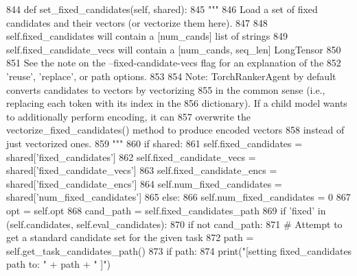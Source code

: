 \begin{DoxyCode}
844     \textcolor{keyword}{def }set\_fixed\_candidates(self, shared):
845         \textcolor{stringliteral}{"""}
846 \textcolor{stringliteral}{        Load a set of fixed candidates and their vectors (or vectorize them here).}
847 \textcolor{stringliteral}{}
848 \textcolor{stringliteral}{        self.fixed\_candidates will contain a [num\_cands] list of strings}
849 \textcolor{stringliteral}{        self.fixed\_candidate\_vecs will contain a [num\_cands, seq\_len] LongTensor}
850 \textcolor{stringliteral}{}
851 \textcolor{stringliteral}{        See the note on the --fixed-candidate-vecs flag for an explanation of the}
852 \textcolor{stringliteral}{        'reuse', 'replace', or path options.}
853 \textcolor{stringliteral}{}
854 \textcolor{stringliteral}{        Note: TorchRankerAgent by default converts candidates to vectors by vectorizing}
855 \textcolor{stringliteral}{        in the common sense (i.e., replacing each token with its index in the}
856 \textcolor{stringliteral}{        dictionary). If a child model wants to additionally perform encoding, it can}
857 \textcolor{stringliteral}{        overwrite the vectorize\_fixed\_candidates() method to produce encoded vectors}
858 \textcolor{stringliteral}{        instead of just vectorized ones.}
859 \textcolor{stringliteral}{        """}
860         \textcolor{keywordflow}{if} shared:
861             self.fixed\_candidates = shared[\textcolor{stringliteral}{'fixed\_candidates'}]
862             self.fixed\_candidate\_vecs = shared[\textcolor{stringliteral}{'fixed\_candidate\_vecs'}]
863             self.fixed\_candidate\_encs = shared[\textcolor{stringliteral}{'fixed\_candidate\_encs'}]
864             self.num\_fixed\_candidates = shared[\textcolor{stringliteral}{'num\_fixed\_candidates'}]
865         \textcolor{keywordflow}{else}:
866             self.num\_fixed\_candidates = 0
867             opt = self.opt
868             cand\_path = self.fixed\_candidates\_path
869             \textcolor{keywordflow}{if} \textcolor{stringliteral}{'fixed'} \textcolor{keywordflow}{in} (self.candidates, self.eval\_candidates):
870                 \textcolor{keywordflow}{if} \textcolor{keywordflow}{not} cand\_path:
871                     \textcolor{comment}{# Attempt to get a standard candidate set for the given task}
872                     path = self.get\_task\_candidates\_path()
873                     \textcolor{keywordflow}{if} path:
874                         print(\textcolor{stringliteral}{"[setting fixed\_candidates path to: "} + path + \textcolor{stringliteral}{" ]"})

\end{DoxyCode}

